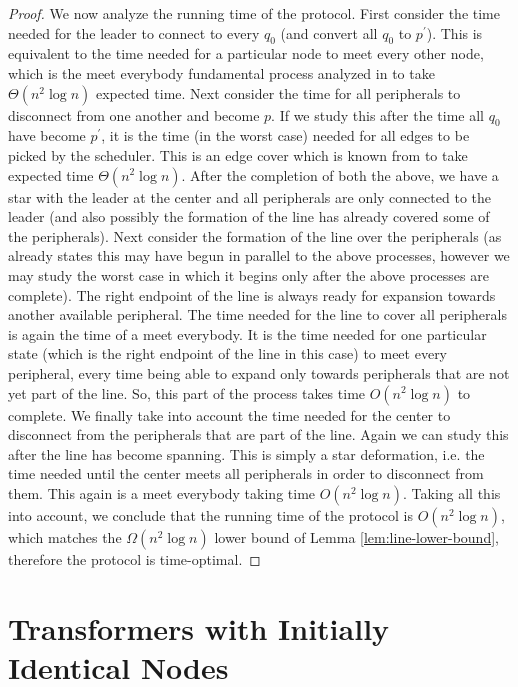 \documentclass[preprint]{elsarticle}
\begin{document}
\begin{proof}
We now analyze the running time of the protocol. First consider the time needed for the leader to connect to every $q_0$ (and convert all $q_0$ to $p^\prime$). This is equivalent to the time needed for a particular node to meet every other node, which is the meet everybody fundamental process analyzed in \cite{MS14} to take $\Theta(n^2 \log n)$ expected time. Next consider the time for all peripherals to disconnect from one another and become $p$. If we study this after the time all $q_0$ have become $p^\prime$, it is the time (in the worst case) needed for all edges to be picked by the scheduler. This is an edge cover which is known from \cite{MS14} to take expected time $\Theta(n^2 \log n)$. After the completion of both the above, we have a star with the leader at the center and all peripherals are only connected to the leader (and also possibly the formation of the line has already covered some of the peripherals). Next consider the formation of the line over the peripherals (as already states this may have begun in parallel to the above processes, however we may study the worst case in which it begins only after the above processes are complete). The right endpoint of the line is always ready for expansion towards another available peripheral. The time needed for the line to cover all peripherals is again the time of a meet everybody. It is the time needed for one particular state (which is the right endpoint of the line in this case) to meet every peripheral, every time being able to expand only towards peripherals that
are not yet part of the line. So, this part of the process takes time $O(n^2 \log n)$ to complete. We finally take into account the time needed for the center to disconnect from the peripherals that are part of the line. Again we can study this after the line has become spanning. This is simply a star deformation, i.e. the time needed until the center meets all peripherals in order to disconnect from them. This again is a meet everybody taking time $O(n^2 \log n)$. Taking all this into account, we conclude that the running time of the protocol is $O(n^2 \log n)$, which matches the $\Omega(n^2 \log n)$ lower bound of Lemma \ref{lem:line-lower-bound}, therefore the protocol is time-optimal.
\end{proof}

\section{Transformers with Initially Identical Nodes}
\label{sec:identical-nodes}
\end{document}
